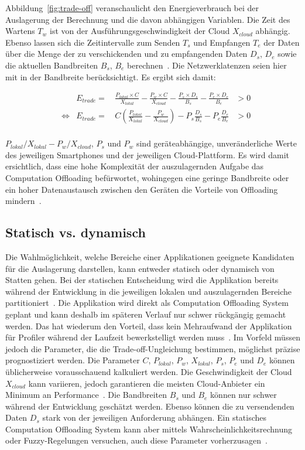 \documentclass{sigchi}
\begin{document}
Abbildung~\ref{fig:trade-off} veranschaulicht den Energieverbrauch bei der Auslagerung der Berechnung und die davon abhängigen Variablen. Die Zeit des Wartens $T_w$ ist von der Aus\-füh\-rungs\-ge\-schwin\-dig\-keit der Cloud $X_{\textit{cloud}}$ abhängig.
Ebenso lassen sich die Zeitintervalle zum Senden $T_s$ und Empfangen $T_e$ der Daten über die Menge der zu verschickenden und zu empfangenden Daten $D_s$, $D_e$ sowie die aktuellen Bandbreiten $B_s$, $B_e$ berechnen~\cite{o8}.
Die Netzwerklatenzen seien hier mit in der Bandbreite berücksichtigt.
Es ergibt sich damit:

\begin{align*}
	& & E_{\textit{trade}} = & \,\frac{P_{\textit{lokal}} \times C}{X_\textit{lokal}} - \frac{P_w \times C}{X_{\textit{cloud}}} - \frac{P_s \times D_s}{B_s} - \frac{P_e \times D_e}{B_e} & > 0 \\
	& \Leftrightarrow & E_{\textit{trade}} = & \, C\left( \frac{P_{\textit{lokal}}}{X_\textit{lokal}} - \frac{P_w}{X_{\textit{cloud}}} \right) - P_s\frac{D_s}{B_s} - P_e\frac{D_e}{B_e} & > 0 \\
\end{align*}

$P_{\textit{lokal}}/X_{\textit{lokal}} - P_{\textit{w}}/X_{\textit{cloud}}$, $P_s$ und $P_w$ sind geräteabhängige, unveränderliche Werte des jeweiligen Smartphones und der jeweiligen Cloud-Plattform.
Es wird damit ersichtlich, dass eine hohe Komplexität der auszulagernden Aufgabe das Computation Offloading befürwortet, wohingegen eine geringe Bandbreite oder ein hoher Datenaustausch zwischen den Geräten die Vorteile von Offloading mindern~\cite{o8}.

\subsection{Statisch vs. dynamisch}

Die Wahlmöglichkeit, welche Bereiche einer Applikationen geeignete Kandidaten für die Auslagerung darstellen, kann entweder statisch oder dynamisch von Statten gehen.
Bei der statischen Entscheidung wird die Applikation bereits während der Entwicklung in die jeweiligen lokalen und auszulagernden Bereiche partitioniert~\cite{o4}.
Die Applikation wird direkt als Computation Offloading System geplant und kann deshalb im späteren Verlauf nur schwer rückgängig gemacht werden.
Das hat wiederum den Vorteil, dass kein Mehraufwand der Applikation für Profiler während der Laufzeit bewerkstelligt werden muss~\cite{o4}.
Im Vorfeld müssen jedoch die Parameter, die die Trade-off-Ungleichung bestimmen, möglichst präzise prognostiziert werden.
Die Parameter $C$, $P_{\textit{lokal}}$, $P_w$, $X_{\textit{lokal}}$, $P_s$, $P_e$ und $D_e$ können üblicherweise vorausschauend kalkuliert werden.
 Die Geschwindigkeit der Cloud $X_{\textit{cloud}}$ kann variieren, jedoch garantieren die meisten Cloud-Anbieter ein Minimum an Performance~\cite{o4}.
 Die Bandbreiten $B_s$ und $B_e$ können nur schwer während der Entwicklung geschätzt werden.
 Ebenso können die zu versendenden Daten $D_s$ stark von der jeweiligen Anforderung abhängen.
 Ein statisches Computation Offloading System kann aber mittels Wahrscheinlichkeitsrechnung oder Fuzzy-Regelungen versuchen, auch diese Parameter vorherzusagen~\cite{o4}.
\end{document}
